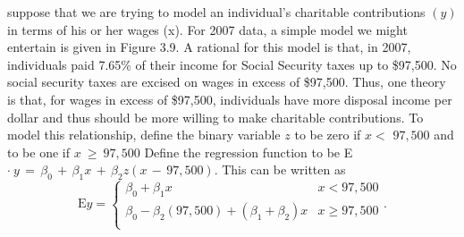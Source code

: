 \documentclass[11pt]{article}
\begin{document}
 suppose that we are trying to model an individual's charitable contributions \(\left( y \right)\) in
terms of his or her wages (x). For 2007 data, a simple model we might entertain
 is given in Figure 3.9.
A rational for this model is that, in 2007, individuals paid 7.65\% of their
income for Social Security taxes up to \$97,500. No social security taxes are
excised on wages in excess of \$97,500. Thus, one theory is that, for wages in
excess of \$97,500, individuals have more disposal income per dollar and thus
 should be more willing to make charitable contributions.
To model this relationship, define the binary variable \(z\) to be zero if \(x <\)
\(9 7 , \! 5 0 0\) and to be one if \(x ~ \geq~ 9 7 , \! 5 0 0\) Define the regression function to be
E \(\cdot\ y \,=\, \beta_{0} \,+\, \beta_{1} x \,+\, \beta_{2} z ( x \,-\, 9 7 {,} 5 0 0 ) .\) This can be written as
\[
\textrm{E} y=\left\{\begin{matrix} {\beta_{0}+\beta_{1} x} & {x < 9 7 , 5 0 0} \\ {\beta_{0}-\beta_{2} ( 9 7 , \! 5 0 0 )+( \beta_{1}+\beta_{2} ) x} & {x \geq9 7 , \! 5 0 0} \\ \end{matrix} \right. .
\]
\end{document}
